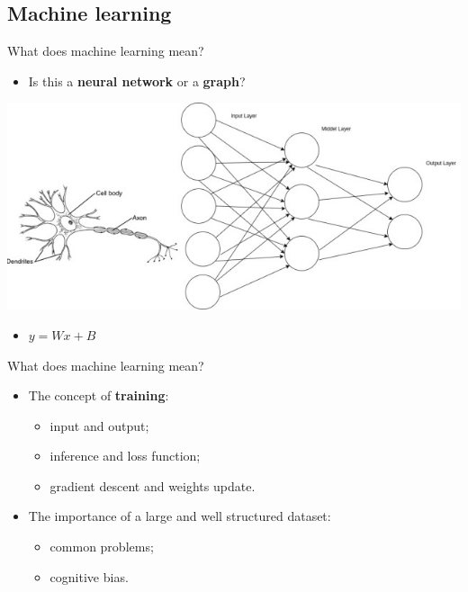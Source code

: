 \documentclass{beamer}
\begin{document}
\subsection{Machine learning}

\begin{frame}{What does machine learning mean?}
	\begin{itemize}
		[triangle]
  		\item
    			Is this a \textbf{neural network} or a \textbf{graph}?
	\end{itemize}
	\begin{center}
		\includegraphics[scale=0.5]{neuralNet}
	\end{center}
	\begin{itemize}
		[triangle]
  		\item
    			\(y = Wx + B\)
	\end{itemize}
		
\end{frame}

\begin{frame}{What does machine learning mean?}
	\begin{itemize}
		\setlength\itemsep{1em}
		[triangle]
  		\item 
			The concept of \textbf{training}:
    			\begin{itemize}
				[circle]
    				\item
      					input and output;
    				\item    
      					inference and loss function;
   				\item
					gradient descent and weights update.
			\end{itemize}
		\item
    			The importance of a large and well structured dataset:
    			\begin{itemize}
				[circle]
   				\item 
					common problems;
    				\item 
					cognitive bias.
    			\end{itemize}
 	 \end{itemize}
\end{frame}
\end{document}
